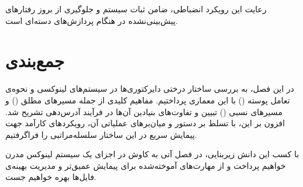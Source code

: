 رعایت این رویکرد انضباطی، ضامن ثبات سیستم و جلوگیری از بروز رفتارهای پیش‌بینی‌نشده در هنگام پردازش‌های دسته‌ای است.

\section{جمع‌بندی}

در این فصل، به بررسی ساختار درختی دایرکتوری‌ها در سیستم‌های لینوکسی و نحوه‌ی تعامل پوسته () با این معماری پرداختیم. مفاهیم کلیدی از جمله مسیرهای مطلق () و مسیرهای نسبی () تبیین و تفاوت‌های بنیادین آن‌ها در فرآیند آدرس‌دهی تشریح شد. افزون بر این، با تسلط بر دستور  و میان‌برهای عملیاتی آن، رویکردهای کارآمد جهت پیمایش سریع در این ساختار سلسله‌مراتبی را فراگرفتیم.

با کسب این دانش زیربنایی، در فصل آتی به کاوش در اجزای یک سیستم لینوکس مدرن خواهیم پرداخت و از مهارت‌های آموخته‌شده برای پیمایش عمیق‌تر و مدیریت بهینه‌ی فایل‌ها بهره خواهیم جست.